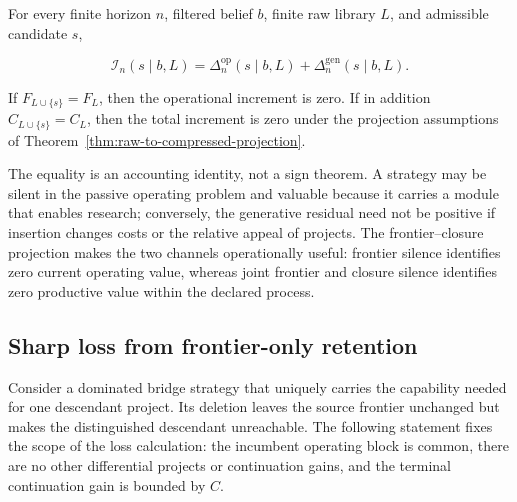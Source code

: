 \begin{proposition}
\label{thm:value-decomposition}
For every finite horizon \(n\), filtered belief \(b\), finite raw library
\(L\), and admissible candidate \(s\),

\begin{equation}
 \mathcal I_n(s\mid b,L)
 =\Delta_n^{\mathrm{op}}(s\mid b,L)
  +\Delta_n^{\mathrm{gen}}(s\mid b,L).
 \label{eq:value-decomposition}
\end{equation}

If \(F_{L\cup\{s\}}=F_L\), then the operational increment is zero. If in
addition \(C_{L\cup\{s\}}=C_L\), then the total increment is zero under the
projection assumptions of Theorem~\ref{thm:raw-to-compressed-projection}.
\end{proposition}

The equality is an accounting identity, not a sign theorem. A strategy may
be silent in the passive operating problem and valuable because it carries a
module that enables research; conversely, the generative residual need not be
positive if insertion changes costs or the relative appeal of projects. The
frontier--closure projection makes the two channels operationally useful:
frontier silence identifies zero current operating value, whereas joint
frontier and closure silence identifies zero productive value within the
declared process.

\subsection{Sharp loss from frontier-only retention}

Consider a dominated bridge strategy that uniquely carries the capability
needed for one descendant project. Its deletion leaves the source frontier
unchanged but makes the distinguished descendant unreachable. The following
statement fixes the scope of the loss calculation: the incumbent operating
block is common, there are no other differential projects or continuation
gains, and the terminal continuation gain is bounded by \(C\).

